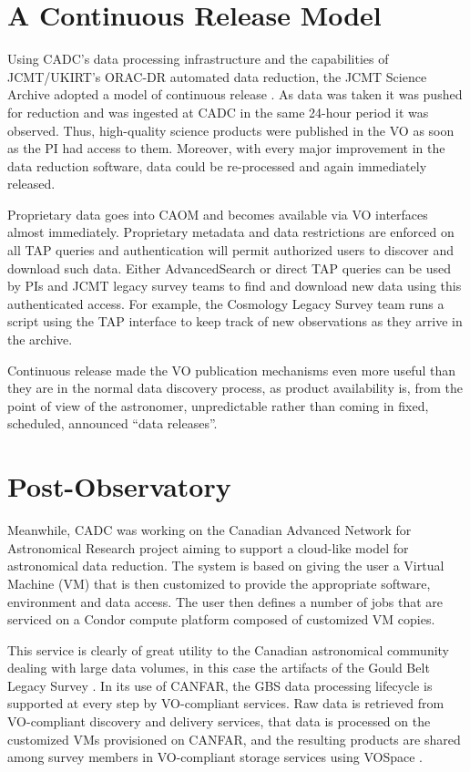 \documentclass[final,authoryear,5p,times,twocolumn]{elsarticle}
\begin{document}
\section{A Continuous Release Model}

Using CADC's data processing infrastructure and the capabilities of
JCMT/UKIRT's ORAC-DR automated data reduction, the JCMT Science
Archive adopted a model of continuous release
\citep{2011ASPC..442..203E}. As data was taken it was pushed for
reduction and was ingested at CADC in the same 24-hour period it was
observed. Thus, high-quality science products were published in the VO
as soon as the PI had access to them. Moreover, with every major
improvement in the data reduction software, data could be re-processed
and again immediately released.

Proprietary data goes into CAOM and becomes available via VO
interfaces almost immediately. Proprietary metadata and data
restrictions are enforced on all TAP \citep{tap} queries and authentication will
permit authorized users to discover and download such data. Either
AdvancedSearch or direct TAP queries can be used by PIs and JCMT
legacy survey teams to find and download new data using this
authenticated access. For example, the Cosmology Legacy Survey team
\citep{2013MNRAS.432...53G} runs a script using the TAP interface to
keep track of new observations as they arrive in the archive.

Continuous release made the VO publication mechanisms even more useful
than they are in the normal data discovery process, as product
availability is, from the point of view of the astronomer,
unpredictable rather than coming in fixed, scheduled, announced ``data
releases''.

\section{Post-Observatory}

Meanwhile, CADC was working on the Canadian Advanced Network for
Astronomical Research \citep[CANFAR;][]{2010SPIE.7740E..51G,2015ACCADC} project aiming to
support a cloud-like model for astronomical data reduction. The system
is based on giving the user a Virtual Machine (VM) that is then customized to
provide the appropriate software, environment and data access. The
user then defines a number of jobs that are serviced on a Condor
compute platform composed of customized VM copies.

This service is clearly of great utility to the Canadian astronomical
community dealing with large data volumes, in this case the artifacts of
the Gould Belt Legacy Survey \citep[GBS;][]{2007PASP..119..855W}.
In its use of CANFAR, the GBS data
processing lifecycle is supported at every step by VO-compliant services.
Raw data is retrieved from VO-compliant discovery and delivery services,
that data is processed on the customized VMs provisioned on CANFAR, and
the resulting products are shared among survey members in VO-compliant
storage services using VOSpace \citep{vospace}.
\end{document}
